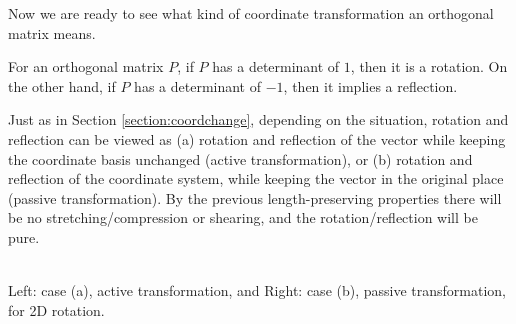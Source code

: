 Now we are ready to see what kind of coordinate transformation an orthogonal matrix means.
\begin{thm}
\label{thm:orthodet}
For an orthogonal matrix $P$, if $P$ has a determinant of $1$, then it is a rotation. On the other hand, if $P$ has a determinant of $-1$, then it implies a reflection.
\end{thm}
Just as in Section \ref{section:coordchange}, depending on the situation, rotation and reflection can be viewed as (a) rotation and reflection of the vector while keeping the coordinate basis unchanged (active transformation), or (b) rotation and reflection of the coordinate system, while keeping the vector in the original place (passive transformation). By the previous length-preserving properties there will be no stretching/compression or shearing, and the rotation/reflection will be pure.

\begin{center}
\\
Left: case (a), active transformation, and Right: case (b), passive transformation, for 2D rotation. 
\end{center}

